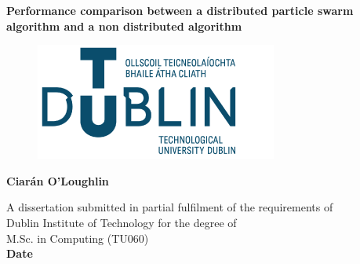 \documentclass[oneside,12pt]{book}
\begin{document}
\begin{titlepage}
    \begin{center}
        \vspace*{1.5cm}
        \Huge
        \textbf{Performance comparison between a distributed particle swarm algorithm and a non distributed algorithm}
        
        \vspace{0.5cm}
        \begin{figure}[H]
    	\centering
    	\hspace{7mm} \includegraphics[scale=0.5]{TU_logo}
        \end{figure}
        
        \vspace{1.5cm}
        
        \textbf{Ciarán O'Loughlin}
        
        \vfill
       \large
        A dissertation submitted in partial fulfilment of the requirements of\\
	Dublin Institute of Technology for the degree of\\
	M.Sc. in Computing (TU060)\\
       \vspace{0.5cm}
        \textbf{Date}
        \vspace{0.8cm}
 
    \end{center}
\end{titlepage}

\pagestyle{fancy}
\fancyhf{}
\fancyfoot[CE,CO]{\thepage}
\renewcommand{\headrulewidth}{0pt}




\end{document}
